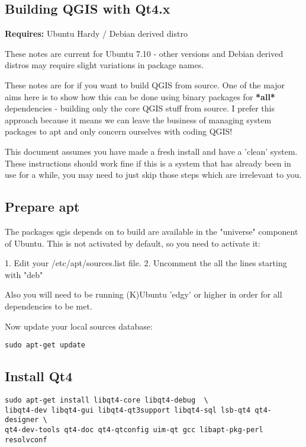 \subsection{Building QGIS with Qt4.x}
\textbf{Requires:} Ubuntu Hardy / Debian derived distro

These notes are current for Ubuntu 7.10 - other versions and Debian derived 
distros may require slight variations in package names.

These notes are for if you want to build QGIS from source. One of the major
aims here is to show how this can be done using binary packages for \textbf{*all*}
dependencies - building only the core QGIS stuff from source. I prefer this
approach because it means we can leave the business of managing system packages
to apt and only concern ourselves with coding QGIS! 

This document assumes you have made a fresh install and have a 'clean' system.
These instructions should work fine if this is a system that has already been
in use for a while, you may need to just skip those steps which are irrelevant
to you.

\subsection{Prepare apt}
The packages qgis depends on to build are available in the "universe" component
of Ubuntu. This is not activated by default, so you need to activate it:

1. Edit your /etc/apt/sources.list file.  
2. Uncomment the all the lines starting with "deb"

Also you will need to be running (K)Ubuntu 'edgy' or higher in order for 
all dependencies to be met.

Now update your local sources database:

\begin{verbatim}
sudo apt-get update 
\end{verbatim}

\subsection{Install Qt4}
\begin{verbatim}
sudo apt-get install libqt4-core libqt4-debug  \
libqt4-dev libqt4-gui libqt4-qt3support libqt4-sql lsb-qt4 qt4-designer \
qt4-dev-tools qt4-doc qt4-qtconfig uim-qt gcc libapt-pkg-perl resolvconf
\end{verbatim}

